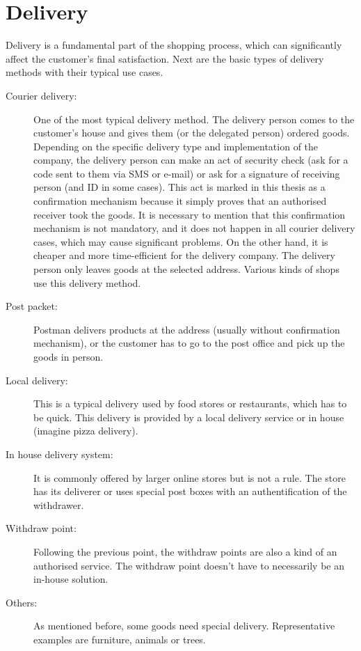 \documentclass[thesis=M,english]{FITthesis}[2019/12/23]
\begin{document}
\section{Delivery}
Delivery is a fundamental part of the shopping process, which can significantly affect the customer's final satisfaction. Next are the basic types of delivery methods with their typical use cases.
\begin{description}

\item[Courier delivery:] One of the most typical delivery method. The delivery person comes to the customer's house and gives them (or the delegated person) ordered goods. Depending on the specific delivery type and implementation of the company, the delivery person can make an act of security check (ask for a code sent to them via SMS or e-mail) or ask for a signature of receiving person (and ID in some cases). This act is marked in this thesis as a confirmation mechanism because it simply proves that an authorised receiver took the goods. It is necessary to mention that this confirmation mechanism is not mandatory, and it does not happen in all courier delivery cases, which may cause significant problems. On the other hand, it is cheaper and more time-efficient for the delivery company. The delivery person only leaves goods at the selected address.
Various kinds of shops use this delivery method.

\item[Post packet:] Postman delivers products at the address (usually without confirmation mechanism), or the customer has to go to the post office and pick up the goods in person.

\item[Local delivery:] This is a typical delivery used by food stores or restaurants, which has to be quick. This delivery is provided by a local delivery service or in house (imagine pizza delivery). 

\item[In house delivery system:] It is commonly offered by larger online stores but is not a rule. The store has its deliverer or uses special post boxes with an authentification of the withdrawer. 

\item[Withdraw point:]  Following the previous point, the withdraw points are also a kind of an authorised service. The withdraw point doesn't have to necessarily be an in-house solution. \cite{zasielkovna}

\item[Others:] As mentioned before, some goods need special delivery. Representative examples are furniture, animals or trees. 
\end{description}
\end{document}
